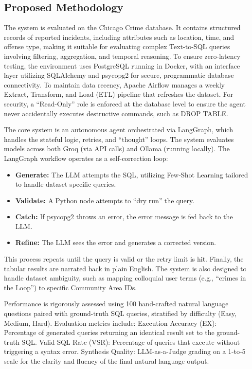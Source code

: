 \documentclass{article}
\begin{document}
\subsection{Proposed Methodology}

The system is evaluated on the Chicago Crime database. It contains structured records of reported incidents, including attributes such as location, time, and offense type, making it suitable for evaluating complex Text-to-SQL queries involving filtering, aggregation, and temporal reasoning. To ensure zero-latency testing, the environment uses PostgreSQL running in Docker, with an interface layer utilizing SQLAlchemy and psycopg2 for secure, programmatic database connectivity. To maintain data recency, Apache Airflow manages a weekly Extract, Transform, and Load (ETL) pipeline that refreshes the dataset. For security, a ``Read-Only'' role is enforced at the database level to ensure the agent never accidentally executes destructive commands, such as DROP TABLE.

The core system is an autonomous agent orchestrated via LangGraph, which handles the stateful logic, retries, and ``thought'' loops. The system evaluates models across both Groq (via API calls) and Ollama (running locally). The LangGraph workflow operates as a self-correction loop:

\begin{itemize}
    \item \textbf{Generate:} The LLM attempts the SQL, utilizing Few-Shot Learning tailored to handle dataset-specific queries.
    \item \textbf{Validate:} A Python node attempts to ``dry run'' the query.
    \item \textbf{Catch:} If psycopg2 throws an error, the error message is fed back to the LLM.
    \item \textbf{Refine:} The LLM sees the error and generates a corrected version.
\end{itemize}

This process repeats until the query is valid or the retry limit is hit. Finally, the tabular results are narrated back in plain English. The system is also designed to handle dataset ambiguity, such as mapping colloquial user terms (e.g., ``crimes in the Loop'') to specific Community Area IDs.

Performance is rigorously assessed using 100 hand-crafted natural language questions paired with ground-truth SQL queries, stratified by difficulty (Easy, Medium, Hard). Evaluation metrics include: Execution Accuracy (EX): Percentage of generated queries returning an identical result set to the ground-truth SQL. Valid SQL Rate (VSR): Percentage of queries that execute without triggering a syntax error. Synthesis Quality: LLM-as-a-Judge grading on a 1-to-5 scale for the clarity and fluency of the final natural language output.
\end{document}
